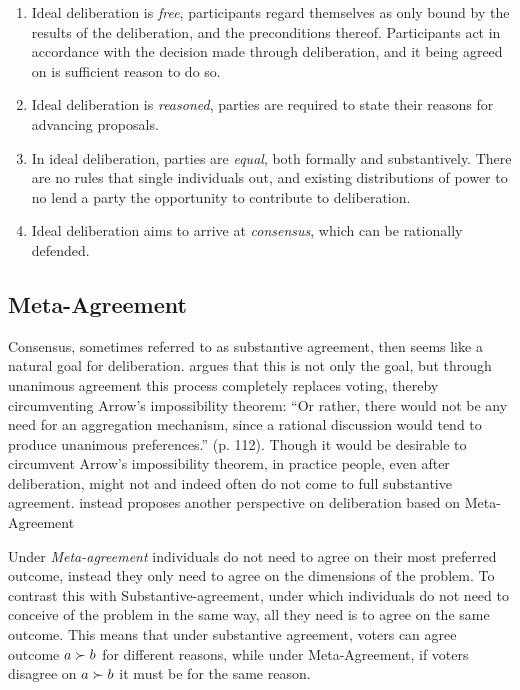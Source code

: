 \begin{enumerate}
	\label{list:ideal-deliberation}
	\setlength\itemsep{1px}
	\item  Ideal deliberation is \emph{free}, participants regard themselves as only bound by the results of the deliberation, and the preconditions thereof. Participants act in accordance with the decision made through deliberation, and it being agreed on is sufficient reason to do so.
	\item  Ideal deliberation is \emph{reasoned}, parties are required to state their reasons for advancing proposals.
	\item  In ideal deliberation, parties are \emph{equal}, both formally and substantively. There are no rules that single individuals out, and existing distributions of power to no lend a party the opportunity to contribute to deliberation.
	\item  Ideal deliberation aims to arrive at \emph{consensus}, which can be rationally defended.
\end{enumerate}

\subsection{Meta-Agreement}
\label{subsection:Meta-agreement}

Consensus, sometimes referred to as substantive agreement, then seems like a
natural goal for deliberation. \citet{elsterMARKETFORUMThree2002} argues that
this is not only the goal, but through unanimous agreement this process
completely replaces voting, thereby circumventing Arrow's impossibility
theorem: ``Or rather, there would not be any need for an aggregation mechanism,
since a rational discussion would tend to produce unanimous preferences.'' (p.
112). Though it would be desirable to circumvent Arrow's impossibility theorem,
in practice people, even after deliberation, might not and indeed often do not
come to full substantive agreement. \citet{listTwoConceptsAgreement2002}
instead proposes another perspective  on deliberation based on Meta-Agreement

Under \emph{Meta-agreement} individuals do not need to agree on their most
preferred outcome, instead they only need to agree on the dimensions of the
problem. To contrast this with Substantive-agreement, under which individuals
do not need to conceive of the problem in the same way, all they need is to
agree on the same outcome. This means that under substantive agreement, voters
can agree outcome $a \succ b$ for different reasons, while under
Meta-Agreement, if voters disagree on $a \succ b$ it must be for the same
reason.

